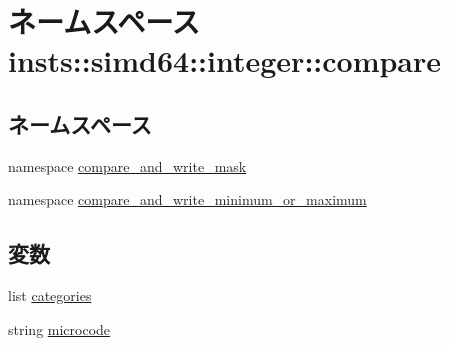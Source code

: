 \hypertarget{namespaceinsts_1_1simd64_1_1integer_1_1compare}{
\section{ネームスペース insts::simd64::integer::compare}
\label{namespaceinsts_1_1simd64_1_1integer_1_1compare}
}
\subsection*{ネームスペース}
\begin{DoxyCompactItemize}
\item 
namespace \hyperlink{namespaceinsts_1_1simd64_1_1integer_1_1compare_1_1compare__and__write__mask}{compare\_\-and\_\-write\_\-mask}
\item 
namespace \hyperlink{namespaceinsts_1_1simd64_1_1integer_1_1compare_1_1compare__and__write__minimum__or__maximum}{compare\_\-and\_\-write\_\-minimum\_\-or\_\-maximum}
\end{DoxyCompactItemize}
\subsection*{変数}
\begin{DoxyCompactItemize}
\item 
list \hyperlink{namespaceinsts_1_1simd64_1_1integer_1_1compare_a273cf0f1630af14c1582f05e53354a55}{categories}
\item 
string \hyperlink{namespaceinsts_1_1simd64_1_1integer_1_1compare_a770f11a173e99389a8802f0107ed8f52}{microcode}
\end{DoxyCompactItemize}


